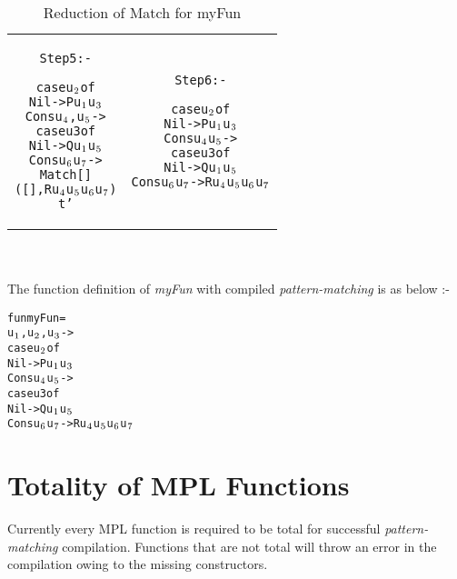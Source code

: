 \documentclass[11pt]{article}
\begin{document}
\begin{table}[h!]
\begin{center}
\begin{tabular}{|c|c|}
\begin{minipage}{3.5in}
\begin{alltt}
\end{alltt} 
\end {minipage} \\ 
\hline
\begin{minipage}{3.5in}
\begin{alltt}

Step 5 :-

case u\(\sb{2}\) of 
  Nil -> P u\(\sb{1}\) u\(\sb{3}\)
  Cons u\(\sb{4}\),u\(\sb{5}\) -> 
    case u3 of 
      Nil -> Q u\(\sb{1}\) u\(\sb{5}\)
      Cons u\(\sb{6}\) u\(\sb{7}\) -> 
        Match []
              ([],R u\(\sb{4}\) u\(\sb{5}\) u\(\sb{6}\) u\(\sb{7}\))
              t' 

\end{alltt} 
\end {minipage} &
\begin{minipage}{3.5in}
\begin{alltt}
Step 6 :-

case u\(\sb{2}\) of 
  Nil -> P u\(\sb{1}\) u\(\sb{3}\)
  Cons u\(\sb{4}\) u\(\sb{5}\) -> 
    case u3 of 
      Nil -> Q u\(\sb{1}\) u\(\sb{5}\)
      Cons u\(\sb{6}\) u\(\sb{7}\) -> R u\(\sb{4}\) u\(\sb{5}\) u\(\sb{6}\) u\(\sb{7}\)



\end{alltt} 
\end {minipage}
\tabularnewline
\hline
\end{tabular}
\caption{Reduction of Match for myFun}
\label{exMyFun}
\end{center}
\end{table}
~~\\~~\\
The function definition of {\em myFun} with compiled {\em pattern-matching} is as below :- 
\newpage
\begin{alltt}
fun myFun =
   u\(\sb{1}\),u\(\sb{2}\),u\(\sb{3}\) ->
        case u\(\sb{2}\) of 
          Nil -> P u\(\sb{1}\) u\(\sb{3}\)
          Cons u\(\sb{4}\) u\(\sb{5}\) -> 
            case u3 of 
              Nil -> Q u\(\sb{1}\) u\(\sb{5}\)
              Cons u\(\sb{6}\) u\(\sb{7}\) -> R u\(\sb{4}\) u\(\sb{5}\) u\(\sb{6}\) u\(\sb{7}\)



\end{alltt} 

\section {Totality of MPL Functions}
Currently every MPL function is required to be total for successful {\em pattern-matching} compilation. Functions that are not total will throw an error in the compilation owing to the missing constructors.
\end{document}
